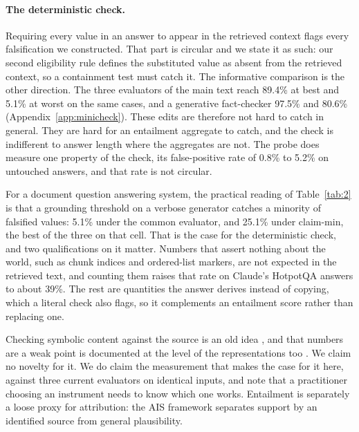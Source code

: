 \paragraph{The deterministic check.} Requiring every value in an answer to appear in the retrieved context flags every falsification we constructed. That part is circular and we state it as such: our second eligibility rule defines the substituted value as absent from the retrieved context, so a containment test must catch it. The informative comparison is the other direction. The three evaluators of the main text reach 89.4\% at best and 5.1\% at worst on the same cases, and a generative fact-checker 97.5\% and 80.6\% (Appendix~\ref{app:minicheck}). These edits are therefore not hard to catch in general. They are hard for an entailment aggregate to catch, and the check is indifferent to answer length where the aggregates are not. The probe does measure one property of the check, its false-positive rate of 0.8\% to 5.2\% on untouched answers, and that rate is not circular.

For a document question answering system, the practical reading of Table~\ref{tab:2} is that a grounding threshold on a verbose generator catches a minority of falsified values: 5.1\% under the common evaluator, and 25.1\% under claim-min, the best of the three on that cell. That is the case for the deterministic check, and two qualifications on it matter. Numbers that assert nothing about the world, such as chunk indices and ordered-list markers, are not expected in the retrieved text, and counting them raises that rate on Claude's HotpotQA answers to about 39\%. The rest are quantities the answer derives instead of copying, which a literal check also flags, so it complements an entailment score rather than replacing one.

Checking symbolic content against the source is an old idea \citep{goodrich-etal-2019, nan-etal-2021, zhao-etal-2020}, and that numbers are a weak point is documented at the level of the representations too \citep{wallace-etal-2019}. We claim no novelty for it. We do claim the measurement that makes the case for it here, against three current evaluators on identical inputs, and note that a practitioner choosing an instrument needs to know which one works. Entailment is separately a loose proxy for attribution: the AIS framework \citep{rashkin-etal-2023} separates support by an identified source from general plausibility.
